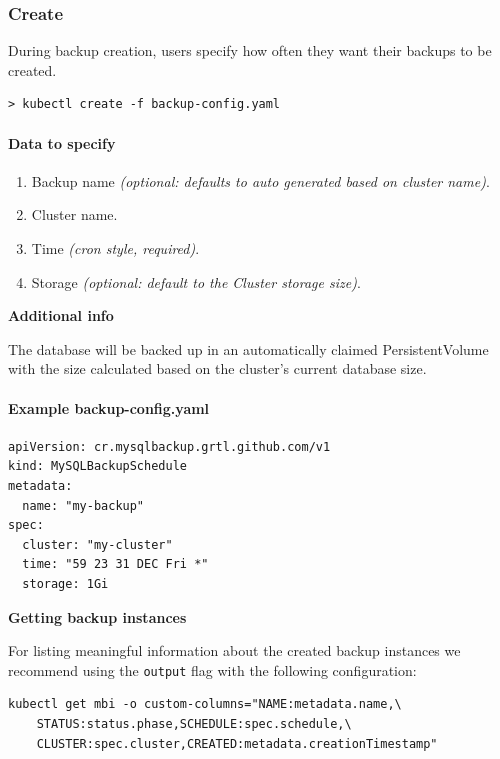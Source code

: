 \subsubsection*{Create}

During backup creation, users specify how often they want their backups
to be created.

\begin{lstlisting}
> kubectl create -f backup-config.yaml
\end{lstlisting}

\paragraph{Data to specify}
\begin{enumerate}
	\item Backup name \textit{(optional: defaults to auto generated based on cluster name)}.
	\item Cluster name.
	\item Time \textit{(cron style, required)}.
	\item Storage \textit{(optional: default to the Cluster storage size)}.
\end{enumerate}

\noindent  \textbf{Additional info}

\noindent The database will be backed up in an automatically claimed PersistentVolume with the size
calculated based on the cluster's current database size.

\paragraph{Example \textbf{backup-config.yaml}}
\begin{lstlisting}[caption=backup-config.yaml,captionpos=b]
apiVersion: cr.mysqlbackup.grtl.github.com/v1
kind: MySQLBackupSchedule
metadata:
  name: "my-backup"
spec:
  cluster: "my-cluster"
  time: "59 23 31 DEC Fri *"
  storage: 1Gi
\end{lstlisting}

\noindent  \textbf{Getting backup instances}

\noindent For listing meaningful information about the created backup instances we recommend
using the \texttt{output} flag with the following configuration:

\begin{lstlisting}
kubectl get mbi -o custom-columns="NAME:metadata.name,\
	STATUS:status.phase,SCHEDULE:spec.schedule,\
	CLUSTER:spec.cluster,CREATED:metadata.creationTimestamp"
\end{lstlisting}

